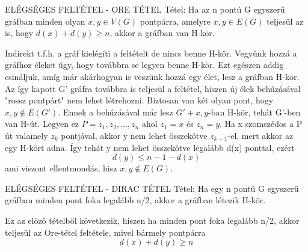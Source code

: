\documentclass[]{article}
\begin{document}
\begin{framed}
ELÉGSÉGES FELTÉTEL - ORE TÉTEL Tétel: Ha az n pontú G egyszerű gráfban minden olyan $x,y\in V(G)$ pontpárra, amelyre ${x,y}\in E(G)$ teljesül az is, hogy $d(x) + d(y) \geq n$, akkor a gráfban van H-kör. 
\end{framed}
\begin{leftbar}
Indirekt t.f.h. a gráf kielégíti a feltételt de nincs benne H-kör. Vegyünk hozzá a gráfhoz éleket úgy, hogy továbbra se legyen benne H-kör. Ezt egészen addig csináljuk, amíg már akárhogyan is veszünk hozzá egy élet, lesz a gráfban H-kör. Az így kapott G' gráfra továbbra is teljesül a feltétel, hiszen új élek behúzásával "rossz pontpárt" nem lehet létrehozni. Biztosan van két olyan pont, hogy ${x,y} \not \in E(G')$. Ennek a behúzásával már lesz $G' + {x,y}$-ban H-kör, tehát G'-ben van H-út. Legyen ez $P = {z_1, z_2,...,z_n}$ ahol $z_1 = x$ és $z_n = y$.
Ha x szomszédos a P út valamely $z_k$ pontjával, akkor y nem lehet összekötve $z_{k-1}$-el, mert akkor az egy H-kört adna. Így tehát y nem lehet összekötve legalább d(x) ponttal, ezért
$$d(y) \leq n - 1 - d(x)$$
ami viszont ellentmondás, hisz ${x,y} \not\in E(G)$.
\end{leftbar}
\begin{framed}
ELÉGSÉGES FELTÉTEL - DIRAC TÉTEL Tétel: Ha egy n pontú G egyszerű gráfban minden pont foka legalább n/2, akkor a gráfban létezik H-kör.
\end{framed}
\begin{leftbar}
Ez az előző tételből következik, hiszen ha minden pont foka legalább n/2, akkor teljesül az Ore-tétel feltétele, mivel bármely pontpárra $$d(x) + d(y) \geq n$$
\end{leftbar}
\end{document}
